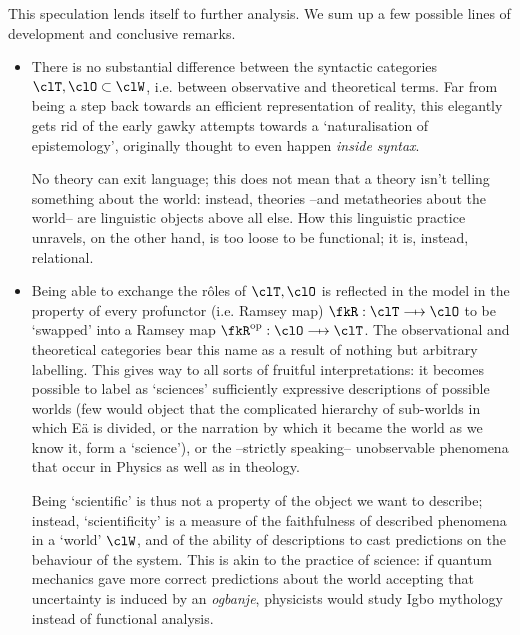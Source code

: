 This speculation lends itself to further analysis. We sum up a few possible lines of development and conclusive remarks.
\begin{itemize}
  \item There is no substantial difference between the syntactic categories $\clT,\clO\subset \clW$, i.e. between observative and theoretical terms. Far from being a step back towards an efficient representation of reality, this elegantly gets rid of the early gawky attempts towards a `naturalisation of epistemology', originally thought to even happen \emph{inside syntax}.

        No theory can exit language; this does not mean that a theory isn't telling something about the world: instead, theories --and metatheories about the world-- are linguistic objects above all else. How this linguistic practice unravels, on the other hand, is too loose to be functional; it is, instead, relational.
  \item Being able to exchange the r\^oles of $\clT,\clO$ is reflected in the model in the property of every profunctor (i.e. Ramsey map) $\fkR : \clT \pto \clO$ to be `swapped' into a Ramsey map $\fkR^\op : \clO \pto \clT$. The observational and theoretical categories bear this name as a result of nothing but arbitrary labelling. This gives way to all sorts of fruitful interpretations: it becomes possible to label as `sciences' sufficiently expressive descriptions of possible worlds (few would object that the complicated hierarchy of sub-worlds in which Eä is divided, or the narration by which it became the world as we know it, form a `science'), or the --strictly speaking-- unobservable phenomena that occur in Physics as well as in theology.

        Being `scientific' is thus not a property of the object we want to describe; instead, `scientificity' is a measure of the faithfulness of described phenomena in a `world' $\clW$, and of the ability of descriptions to cast predictions on the behaviour of the system. This is akin to the practice of science: if quantum mechanics gave more correct predictions about the world accepting that uncertainty is induced by an \emph{ogbanje}, physicists would study Igbo mythology instead of functional analysis.

\end{itemize}